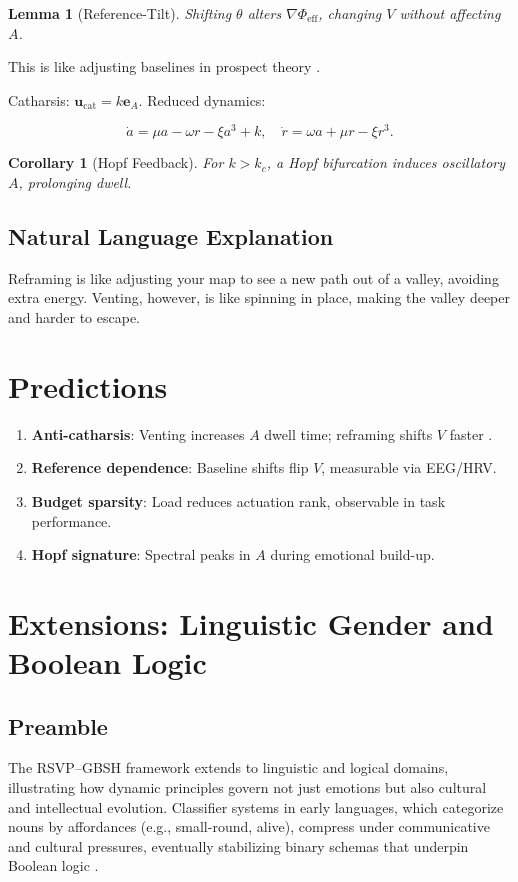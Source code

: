\documentclass[11pt]{article}
\theoremstyle{plain}
\newtheorem{lemma}{Lemma}
\newtheorem{corollary}{Corollary}
\begin{document}
\begin{lemma}[Reference-Tilt]
Shifting \(\theta\) alters \(\nabla \Phi_{\text{eff}}\), changing \(V\) without affecting \(A\).
\end{lemma}

This is like adjusting baselines in prospect theory \citep{Goody1977}.

Catharsis: \(\mathbf{u}_{\text{cat} } = k \mathbf{e}_A\). Reduced dynamics:

\[
\dot{a} = \mu a - \omega r - \xi a^3 + k, \quad \dot{r} = \omega a + \mu r - \xi r^3.
\]

\begin{corollary}[Hopf Feedback]
For \(k > k_c\), a Hopf bifurcation induces oscillatory \(A\), prolonging dwell.
\end{corollary}

\subsection{Natural Language Explanation}
Reframing is like adjusting your map to see a new path out of a valley, avoiding extra energy. Venting, however, is like spinning in place, making the valley deeper and harder to escape.

\section{Predictions}

\begin{enumerate}
\item \textbf{Anti-catharsis}: Venting increases \(A\) dwell time; reframing shifts \(V\) faster \citep{Brown1988}.
\item \textbf{Reference dependence}: Baseline shifts flip \(V\), measurable via EEG/HRV.
\item \textbf{Budget sparsity}: Load reduces actuation rank, observable in task performance.
\item \textbf{Hopf signature}: Spectral peaks in \(A\) during emotional build-up.
\end{enumerate}

\section{Extensions: Linguistic Gender and Boolean Logic}

\subsection{Preamble}
The RSVP–GBSH framework extends to linguistic and logical domains, illustrating how dynamic principles govern not just emotions but also cultural and intellectual evolution. Classifier systems in early languages, which categorize nouns by affordances (e.g., small-round, alive), compress under communicative and cultural pressures, eventually stabilizing binary schemas that underpin Boolean logic \citep{Aikhenvald2000, Boole1854}.
\end{document}
